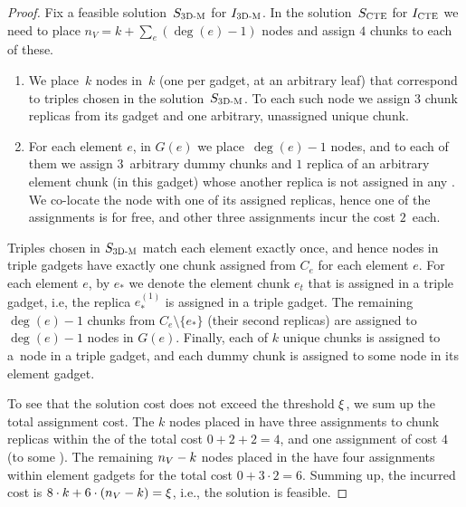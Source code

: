 \begin{proof}
  Fix a feasible solution~$S_{\mathrm{\textsc{3D-M}}}$ for $I_{\mathrm{\textsc{3D-M}}}$. In the solution~$S_{\mathrm{\textsc{CTE}}}$ for $I_{\mathrm{\textsc{CTE}}}$ we need to place $n_V = k + \sum_e(\deg(e) - 1)$ nodes and assign $4$ chunks to each of these.
  \begin{enumerate}
    \item We place~$k$ nodes in~$k$ {\TripleGadgets} (one per gadget, at an arbitrary leaf) that correspond to triples chosen in the solution~$S_{\mathrm{\textsc{3D-M}}}$.
    To each such node we assign $3$ chunk replicas from its gadget and one arbitrary, unassigned unique chunk.
    \item For each element $e$, in $G(e)$ we place~$\deg(e) - 1$ nodes, and to each of them we assign $3$~arbitrary dummy chunks and $1$ replica of an arbitrary 
    element chunk (in this
    gadget) whose another replica is not assigned in any {\TripleGadget}.
    We co-locate the node with one of its assigned replicas, hence one of the assignments is for free, and other three assignments incur the cost $2$~each.
  \end{enumerate}
  Triples chosen in $S_{\mathrm{\textsc{3D-M}}}$ match each element exactly once,
  and hence nodes in triple gadgets have exactly one chunk assigned from $C_e$ for each element $e$.
  For each element $e$, by $e_*$ we denote the element chunk $e_t$ that is assigned in a triple gadget, i.e, the replica $e_*^{(1)}$ is assigned in a triple gadget.
  The remaining $\deg(e)-1$ chunks from $C_e \setminus \{ e_* \}$ (their second replicas) are assigned to $\deg(e)-1$ nodes in $G(e)$.
  Finally, each of $k$ unique chunks is assigned to a~node in a triple gadget, and each dummy chunk is assigned to some node in its element gadget.
  
  To see that the solution cost does not exceed the threshold $\xi$, we sum up the total assignment cost.
  The $k$ nodes placed in \TripleGadgets{} have three assignments to chunk replicas within the \TripleGadget{} of the total cost $0+2+2=4$, and one assignment of cost $4$ (to some \UnqGadget{}).
  The remaining $n_V-k$ nodes placed in the \CoverSubtree{} have four assignments within element gadgets for the total cost $0+3\cdot 2 = 6$.
  Summing up, the incurred cost is $8\cdot k + 6\cdot (n_V - k) = \xi$, i.e., the solution is feasible.
\end{proof}


